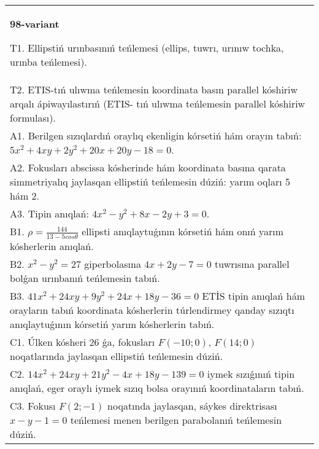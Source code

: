 \documentclass{article}
\begin{document}
\begin{tabular}{m{17cm}}
\textbf{98-variant}
\newline

T1. Ellipstiń urınbasınıń teńlemesi (ellips, tuwrı, urınıw tochka, urınba teńlemesi).\\

T2. ETIS-tıń ulıwma teńlemesin koordinata basın parallel kóshiriw arqalı ápiwayılastırıń (ETIS- tıń ulıwma teńlemesin parallel kóshiriw formulası).\\

A1. Berilgen sızıqlardıń oraylıq ekenligin kórsetiń hám orayın tabıń: $5 x^{2}+4 xy+2 y^{2}+20 x+20 y-18=0$.\\

A2. Fokusları abscissa kósherinde hám koordinata basına qarata simmetriyalıq jaylasqan ellipstiń teńlemesin dúziń: yarım oqları 5 hám 2.\\

A3. Tipin anıqlań: $4 x^{2}-y^{2}+8 x-2 y+3=0$.\\

B1. $\rho = \frac{144}{13 - 5cos\theta}$ ellipsti anıqlaytuǵının kórsetiń hám onıń yarım kósherlerin anıqlań.\\

B2. $x^{2} - y^{2} = 27$ giperbolasına $4x + 2y - 7 = 0$ tuwrısına parallel bolǵan urınbanıń teńlemesin tabıń.  \\

B3. $41x^{2} + 24xy + 9y^{2} + 24x + 18y - 36 = 0$ ETİS tipin anıqlań hám orayların tabıń koordinata kósherlerin túrlendirmey qanday sızıqtı anıqlaytuǵının kórsetiń yarım kósherlerin tabıń.  \\

C1. Úlken kósheri 26 ǵa, fokusları $F( - 10;0)$, $F(14;0)$ noqatlarında jaylasqan ellipstiń teńlemesin dúziń.  \\

C2. $14x^{2} + 24xy + 21y^{2} - 4x + 18y - 139 = 0$ iymek sızıǵınıń tipin anıqlań, eger oraylı iymek sızıq bolsa orayınıń koordinataların tabıń.  \\

C3. Fokusı $F(2; - 1)$ noqatında jaylasqan, sáykes direktrisası $x - y - 1 = 0$ teńlemesi menen berilgen parabolanıń teńlemesin dúziń.  \\

\end{tabular}
\vspace{1cm}
\end{document}
